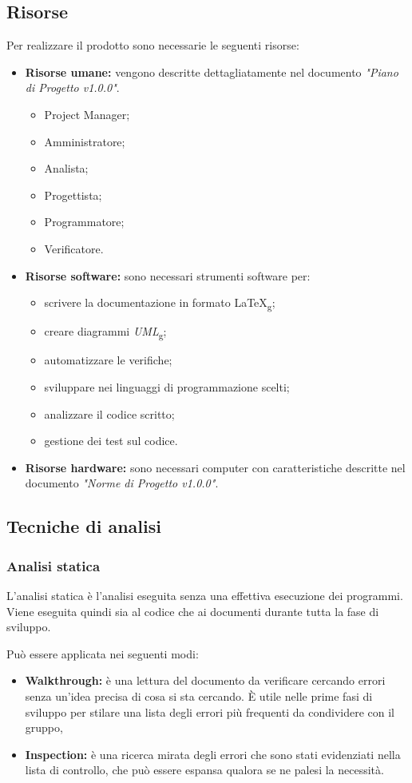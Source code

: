 \documentclass[12pt,a4paper,titlepage]{article}
\begin{document}
	\subsection{Risorse}
	Per realizzare il prodotto sono necessarie le seguenti risorse:
	\begin{itemize}
		\item \textbf{Risorse umane:} vengono descritte dettagliatamente nel documento \textit{"Piano di Progetto v1.0.0"}.
		\begin{itemize}
			\item Project Manager;
			\item Amministratore;
			\item Analista;
			\item Progettista;
			\item Programmatore;
			\item Verificatore.
		\end{itemize}
		\item \textbf{Risorse software:} sono necessari strumenti software per:
		\begin{itemize}
			\item scrivere la documentazione in formato \LaTeX\textsubscript{g};
			\item creare diagrammi \textit{UML}\textsubscript{g};
			\item automatizzare le verifiche;
			\item sviluppare nei linguaggi di programmazione scelti;
			\item analizzare il codice scritto;
			\item gestione dei test sul codice.
		\end{itemize}
		\item \textbf{Risorse hardware:} sono necessari computer con caratteristiche descritte nel documento \textit{"Norme di Progetto v1.0.0"}. 
	\end{itemize}
	\subsection{Tecniche di analisi}
		\subsubsection{Analisi statica}
		L'analisi statica è l'analisi eseguita senza una effettiva esecuzione dei programmi. Viene eseguita quindi sia al codice che ai documenti durante tutta la fase di sviluppo. 
		
		Può essere applicata nei seguenti modi:
		\begin{itemize}
			\item \textbf{Walkthrough:} è una lettura del documento da verificare cercando errori senza un'idea precisa di cosa si sta cercando. È utile nelle prime fasi di sviluppo per stilare una lista degli errori più frequenti da condividere con il gruppo,
			\item \textbf{Inspection:} è una ricerca mirata degli errori che sono stati evidenziati nella lista di controllo, che può essere espansa qualora se ne palesi la necessità.
		\end{itemize}
\end{document}
